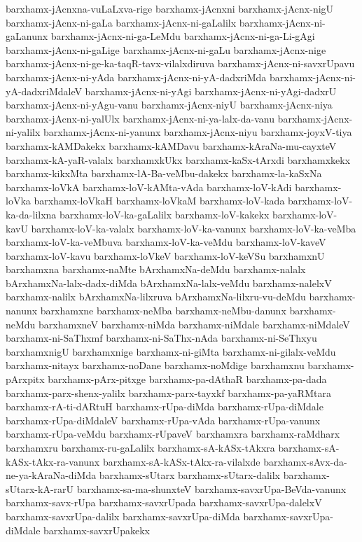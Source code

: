 {barxhamx-jAcnxna-vuLaLxva-rige
barxhamx-jAcnxni
barxhamx-jAcnx-nigU
barxhamx-jAcnx-ni-gaLa
barxhamx-jAcnx-ni-gaLalilx
barxhamx-jAcnx-ni-gaLanunx
barxhamx-jAcnx-ni-ga-LeMdu
barxhamx-jAcnx-ni-ga-Li-gAgi
barxhamx-jAcnx-ni-gaLige
barxhamx-jAcnx-ni-gaLu
barxhamx-jAcnx-nige
barxhamx-jAcnx-ni-ge-ka-taqR-tavx-vilalxdiruva
barxhamx-jAcnx-ni-savxrUpavu
barxhamx-jAcnx-ni-yAda
barxhamx-jAcnx-ni-yA-dadxriMda
barxhamx-jAcnx-ni-yA-dadxriMdaleV
barxhamx-jAcnx-ni-yAgi
barxhamx-jAcnx-ni-yAgi-dadxrU
barxhamx-jAcnx-ni-yAgu-vanu
barxhamx-jAcnx-niyU
barxhamx-jAcnx-niya
barxhamx-jAcnx-ni-yalUlx
barxhamx-jAcnx-ni-ya-lalx-da-vanu
barxhamx-jAcnx-ni-yalilx
barxhamx-jAcnx-ni-yanunx
barxhamx-jAcnx-niyu
barxhamx-joyxV-tiya
barxhamx-kAMDakekx
barxhamx-kAMDavu
barxhamx-kAraNa-mu-cayxteV
barxhamx-kA-yaR-valalx
barxhamxkUkx
barxhamx-kaSx-tArxdi
barxhamxkekx
barxhamx-kikxMta
barxhamx-lA-Ba-veMbu-dakekx
barxhamx-la-kaSxNa
barxhamx-loVkA
barxhamx-loV-kAMta-vAda
barxhamx-loV-kAdi
barxhamx-loVka
barxhamx-loVkaH
barxhamx-loVkaM
barxhamx-loV-kada
barxhamx-loV-ka-da-lilxna
barxhamx-loV-ka-gaLalilx
barxhamx-loV-kakekx
barxhamx-loV-kavU
barxhamx-loV-ka-valalx
barxhamx-loV-ka-vanunx
barxhamx-loV-ka-veMba
barxhamx-loV-ka-veMbuva
barxhamx-loV-ka-veMdu
barxhamx-loV-kaveV
barxhamx-loV-kavu
barxhamx-loVkeV
barxhamx-loV-keVSu
barxhamxnU
barxhamxna
barxhamx-naMte
bArxhamxNa-deMdu
barxhamx-nalalx
bArxhamxNa-lalx-dadx-diMda
bArxhamxNa-lalx-veMdu
barxhamx-nalelxV
barxhamx-nalilx
bArxhamxNa-lilxruva
bArxhamxNa-lilxru-vu-deMdu
barxhamx-nanunx
barxhamxne
barxhamx-neMba
barxhamx-neMbu-danunx
barxhamx-neMdu
barxhamxneV
barxhamx-niMda
barxhamx-niMdale
barxhamx-niMdaleV
barxhamx-ni-SaThxmf
barxhamx-ni-SaThx-nAda
barxhamx-ni-SeThxyu
barxhamxnigU
barxhamxnige
barxhamx-ni-giMta
barxhamx-ni-gilalx-veMdu
barxhamx-nitayx
barxhamx-noDane
barxhamx-noMdige
barxhamxnu
barxhamx-pArxpitx
barxhamx-pArx-pitxge
barxhamx-pa-dAthaR
barxhamx-pa-dada
barxhamx-parx-shenx-yalilx
barxhamx-parx-tayxkf
barxhamx-pa-yaRMtara
barxhamx-rA-ti-dARtuH
barxhamx-rUpa-diMda
barxhamx-rUpa-diMdale
barxhamx-rUpa-diMdaleV
barxhamx-rUpa-vAda
barxhamx-rUpa-vanunx
barxhamx-rUpa-veMdu
barxhamx-rUpaveV
barxhamxra
barxhamx-raMdharx
barxhamxru
barxhamx-ru-gaLalilx
barxhamx-sA-kASx-tAkxra
barxhamx-sA-kASx-tAkx-ra-vanunx
barxhamx-sA-kASx-tAkx-ra-vilalxde
barxhamx-sAvx-da-ne-ya-kAraNa-diMda
barxhamx-sUtarx
barxhamx-sUtarx-dalilx
barxhamx-sUtarx-kA-rarU
barxhamx-sa-ma-shunxteV
barxhamx-savxrUpa-BeVda-vanunx
barxhamx-savx-rUpa
barxhamx-savxrUpada
barxhamx-savxrUpa-dalelxV
barxhamx-savxrUpa-dalilx
barxhamx-savxrUpa-diMda
barxhamx-savxrUpa-diMdale
barxhamx-savxrUpakekx
}
